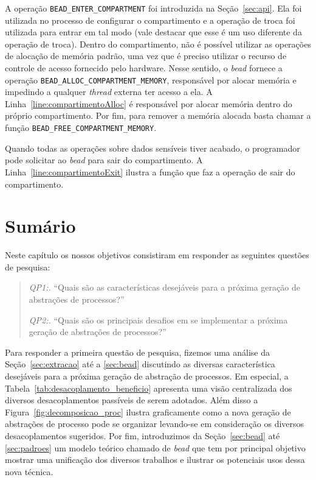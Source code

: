 A operação \texttt{BEAD\_ENTER\_COMPARTMENT} foi introduzida na Seção~\ref{sec:api}. Ela foi
utilizada no processo de configurar o compartimento e a operação de troca foi
utilizada para entrar em tal modo (vale destacar que esse é um uso diferente da
operação de troca). Dentro do compartimento, não é possível utilizar as operações de alocação de memória
padrão, uma vez que é preciso utilizar o recurso de controle de acesso fornecido
pelo hardware. Nesse sentido, o \emph{bead} fornece a operação
\texttt{BEAD\_ALLOC\_COMPARTMENT\_MEMORY}, responsável por alocar memória e impedindo
a qualquer \emph{thread} externa ter acesso a ela.
A Linha~\ref{line:compartimentoAlloc} é responsável por alocar memória
dentro do próprio compartimento. Por fim, para remover a memória alocada basta
chamar a função \texttt{BEAD\_FREE\_COMPARTMENT\_MEMORY}.

Quando todas as operações sobre dados sensíveis tiver acabado, o programador
pode solicitar ao \emph{bead} para sair do compartimento. A
Linha~\ref{line:compartimentoExit} ilustra a função que faz a operação de sair
do compartimento.

\section{Sumário}

Neste capítulo os nossos objetivos consistiram em responder as seguintes
questões de pesquisa:

\begin{quote}
 \item \textit{QP1:.} ``Quais são as características desejáveis para a próxima geração de abstrações de processos?''
 \item \textit{QP2:.} ``Quais são os principais desafios em se implementar a próxima geração de abstrações de processos?''
\end{quote}

Para responder a primeira questão de pesquisa, fizemos uma análise da
Seção~\ref{sec:extracao} até a \ref{sec:bead} discutindo as diversas
característica desejáveis para a próxima geração de abstração de processos. Em
especial, a Tabela~\ref{tab:desacoplamento_beneficio} apresenta uma visão
centralizada dos diversos desacoplamentos passíveis de serem adotados. Além
disso a Figura~\ref{fig:decomposicao_proc} ilustra graficamente como a nova
geração de abstrações de processo pode se organizar levando-se em consideração
os diversos desacoplamentos sugeridos. Por fim, introduzimos da
Seção~\ref{sec:bead} até \ref{sec:padroes} um modelo teórico chamado de
\emph{bead} que tem por principal objetivo mostrar uma unificação dos diversos
trabalhos e ilustrar os potenciais usos dessa nova técnica.

